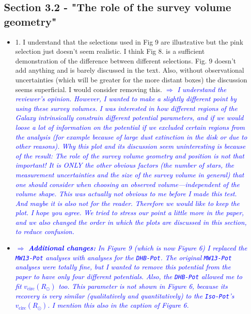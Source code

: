 \documentclass[10pt,a4paper]{article}
\newcommand{\Comment}[1]{\textsl{\textcolor{Blue}{$\Longrightarrow$ {#1}}}}
\begin{document}
\subsection{Section 3.2 - "The role of the survey volume geometry"}
\begin{itemize}
\item 1. I understand that the selections used in Fig 9 are illustrative but the pink selection just doesn't seem realistic. I think Fig 8. is a sufficient demonstration of the difference between different selections. Fig. 9 doesn't add anything and is barely discussed in the text. Also, without observational uncertainties (which will be greater for the more distant boxes) the discussion seems superficial. I would consider removing this. \Comment{I understand the reviewer's opinion. However, I wanted to make a slightly different point by using these survey volumes. I was interested in how different regions of the Galaxy intrinsically constrain different potential parameters, and if we would loose a lot of information on the potential if we excluded certain regions from the analysis (for example because of large dust extinction in the disk or due to other reasons). Why this plot and its discussion seem uninteresting is because of the result: The role of the survey volume geometry and position is not that important! It is ONLY the other obvious factors (the number of stars, the measurement uncertainties and the size of the survey volume in general) that one should consider when choosing an observed volume---independent of the volume shape. This was actually not obvious to me before I made this test. And maybe it is also not for the reader. Therefore we would like to keep the plot. I hope you agree. We tried to stress our point a little more in the paper, and we also changed the order in which the plots are discussed in this section, to reduce confusion.}
\item \Comment{\textbf{Additional changes:} In Figure 9 (which is now Figure 6) I replaced the \texttt{MW13-Pot} analyses with analyses for the \texttt{DHB-Pot}. The original \texttt{MW13-Pot} analyses were totally fine, but I wanted to remove this potential from the paper to have only four different potentials. Also, the \texttt{DHB-Pot} allowed me to fit $v_\text{circ}(R_\odot)$ too. This parameter is not shown in Figure 6, because its recovery is very similar (qualitatively and quantitatively) to the \texttt{Iso-Pot}'s $v_\text{circ}(R_\odot)$. I mention this also in the caption of Figure 6.}
\end{itemize}
\end{document}

